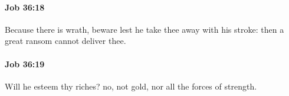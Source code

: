 		\paragraph{Job 36:18} %
			\label{JOB-36-18}

			Because there is wrath, beware lest he take thee away with his stroke: then a great ransom cannot deliver thee.


		\paragraph{Job 36:19} %
			\label{JOB-36-19}

			Will he esteem thy riches? no, not gold, nor all the forces of strength.


